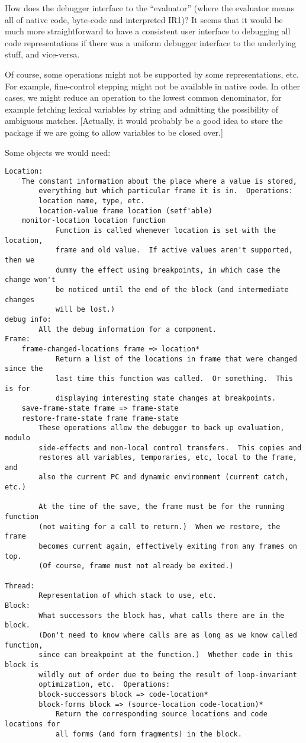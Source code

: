 How does the debugger interface to the ``evaluator'' (where the evaluator means
all of native code, byte-code and interpreted IR1)?  It seems that it would be
much more straightforward to have a consistent user interface to debugging
all code representations if there was a uniform debugger interface to the
underlying stuff, and vice-versa.  

Of course, some operations might not be supported by some representations, etc.
For example, fine-control stepping might not be available in native code.
In other cases, we might reduce an operation to the lowest common denominator,
for example fetching lexical variables by string and admitting the possibility
of ambiguous matches.  [Actually, it would probably be a good idea to store the
package if we are going to allow variables to be closed over.]

Some objects we would need:
\begin{verbatim}
Location:
	The constant information about the place where a value is stored,
        everything but which particular frame it is in.  Operations:
        location name, type, etc.
        location-value frame location (setf'able)
	monitor-location location function
            Function is called whenever location is set with the location,
            frame and old value.  If active values aren't supported, then we
            dummy the effect using breakpoints, in which case the change won't
            be noticed until the end of the block (and intermediate changes
            will be lost.)
debug info:
        All the debug information for a component.
Frame:
	frame-changed-locations frame => location*
            Return a list of the locations in frame that were changed since the
            last time this function was called.  Or something.  This is for
            displaying interesting state changes at breakpoints.
	save-frame-state frame => frame-state
	restore-frame-state frame frame-state
	    These operations allow the debugger to back up evaluation, modulo
	    side-effects and non-local control transfers.  This copies and
	    restores all variables, temporaries, etc, local to the frame, and
	    also the current PC and dynamic environment (current catch, etc.)

	    At the time of the save, the frame must be for the running function
	    (not waiting for a call to return.)  When we restore, the frame
	    becomes current again, effectively exiting from any frames on top.
	    (Of course, frame must not already be exited.)
       
Thread:
        Representation of which stack to use, etc.
Block:
        What successors the block has, what calls there are in the block.
        (Don't need to know where calls are as long as we know called function,
        since can breakpoint at the function.)  Whether code in this block is
        wildly out of order due to being the result of loop-invariant
        optimization, etc.  Operations:
        block-successors block => code-location*
        block-forms block => (source-location code-location)*
            Return the corresponding source locations and code locations for
            all forms (and form fragments) in the block.
\end{verbatim}

